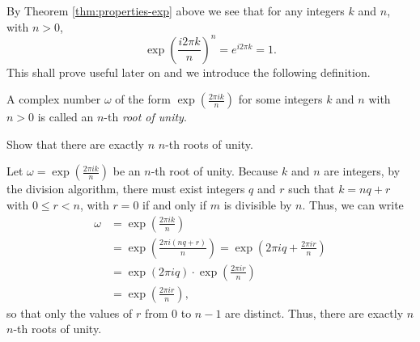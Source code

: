 By Theorem \ref{thm:properties-exp} above we see that for any integers \(k\) and \(n\), with \(n > 0\),
\[
    \exp\left({\frac{i2\pi k}{n}}\right)^n = e^{i2\pi k} = 1.
\]
This shall prove useful later on and we introduce the following definition.

\begin{definition}
    A complex number \(\omega\) of the form \(\exp\left(\frac{2\pi i k}{n}\right)\) for some integers \(k\) and \(n\) with \(n > 0\) is called an \(n\)-th \emph{root of unity}.
    \label{def:roots-of-unity}
\end{definition}

\begin{example}
    Show that there are exactly \(n\) \(n\)-th roots of unity.\label{ex:roots-of-unity-count}

    \begin{solution}
        Let \(\omega = \exp\left(\frac{2\pi i k}{n}\right)\) be an \(n\)-th root of unity. Because \(k\) and \(n\) are integers, by the division algorithm, there must exist
        integers \(q\) and \(r\) such that \(k = nq + r\) with \(0 \leq r < n\), with \(r = 0\) if and only if \(m\) is divisible by \(n\). Thus, we can write
        \[
            \begin{aligned}
                \omega &= \exp\left(\frac{2\pi i k}{n}\right) \\
                &= \exp\left(\frac{2\pi i (nq + r)}{n}\right) 
                = \exp\left(2\pi iq + \frac{2\pi i r}{n}\right)\\&= \exp\left({2\pi i q}\right)\cdot\exp\left(\frac{2\pi i r}{n}\right) \\
                &= \exp\left(\frac{2\pi i r}{n}\right),
            \end{aligned}
        \]
        so that only the values of \(r\) from \(0\) to \(n - 1\) are distinct. Thus, there are exactly \(n\) \(n\)-th roots of unity.
    \end{solution}
\end{example}

